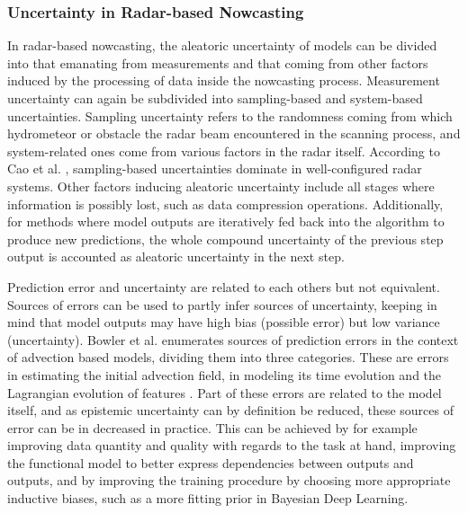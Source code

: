 \subsubsection*{Uncertainty in Radar-based Nowcasting}

In radar-based nowcasting, the aleatoric uncertainty of models can be divided into that emanating from measurements and that coming from other factors induced by the processing of data inside the nowcasting process. Measurement uncertainty can again be subdivided into sampling-based and system-based uncertainties. Sampling uncertainty refers to the randomness coming from which hydrometeor or obstacle the radar beam encountered in the scanning process, and system-related ones come from various factors in the radar itself. According to Cao et al. \cite{cao_measurement_2016}, sampling-based uncertainties dominate in well-configured radar systems. Other factors inducing aleatoric uncertainty include all stages where information is possibly lost, such as data compression operations. Additionally, for methods where model outputs are iteratively fed back into the algorithm to produce new predictions, the whole compound uncertainty of the previous step output is accounted as aleatoric uncertainty in the next step. 


Prediction error and uncertainty are related to each others but not equivalent. Sources of errors can be used to partly infer sources of uncertainty, keeping in mind that model outputs may have high bias (possible error) but low variance (uncertainty). Bowler et al. enumerates sources of prediction errors in the context of advection based models, dividing them into three categories. These are errors in estimating the initial advection field, in modeling its time evolution and the Lagrangian evolution of features \cite{bowler_steps_2006}. Part of these errors are related to the model itself, and as epistemic uncertainty can by definition be reduced, these sources of error can be in decreased in practice. This can be achieved by for example improving data quantity and quality with regards to the task at hand, improving the functional model to better express dependencies between outputs and outputs, and by improving the training procedure by choosing more appropriate inductive biases, such as a more fitting prior in Bayesian Deep Learning. 


